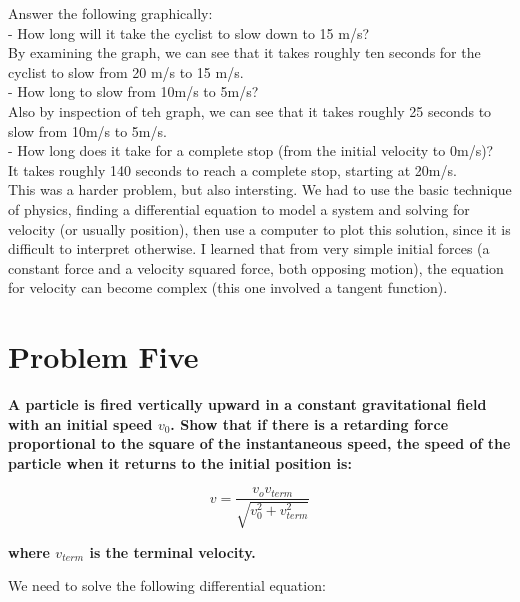 \documentclass[10pt]{article} %
\begin{document}
Answer the following graphically:\\
- How long will it take the cyclist to slow down to 15 m/s?\\

By examining the graph, we can see that it takes roughly ten seconds for the cyclist to slow from 20 m/s to 15 m/s.\\

- How long to slow from 10m/s to 5m/s?\\

Also by inspection of teh graph, we can see that it takes roughly 25 seconds to slow from 10m/s to 5m/s.\\

- How long does it take for a complete stop (from the initial velocity to 0m/s)?\\
It takes roughly 140 seconds to reach a complete stop, starting at 20m/s.\\

This was a harder problem, but also intersting. We had to use the basic technique of physics, finding a differential equation to model a system and solving for velocity (or usually position), then use a computer to plot this solution, since it is difficult to interpret otherwise. I learned that from very simple initial forces (a constant force and a velocity squared force, both opposing motion), the equation for velocity can become complex (this one involved a tangent function).

\section{Problem Five}

\textbf{A particle is fired vertically upward in a constant gravitational field with an initial speed $v_0$.  Show  that  if  there  is  a  retarding  force  proportional  to  the  square  of  the instantaneous speed, the speed of the particle when it returns to the initial position is:}

$$ v = \frac{v_ov_{term}}{\sqrt{v_0^2+v^2_{term}}}  $$

\textbf{where $v_{term}$ is the terminal velocity.}

We need to solve the following differential equation:\\
\end{document}

